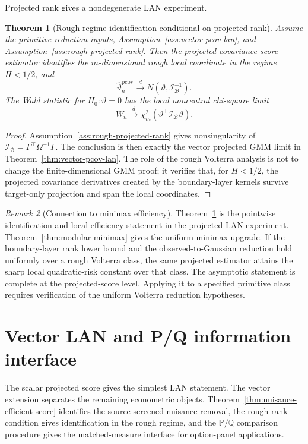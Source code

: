 \documentclass[11pt,a4paper]{amsart}
\theoremstyle{plain}
\newtheorem{theorem}{Theorem}[section]
\theoremstyle{definition}
\theoremstyle{remark}
\newtheorem{remark}[theorem]{Remark}
\newcommand{\PP}{\mathbb{P}}
\newcommand{\QQ}{\mathbb{Q}}
\newcommand{\toD}{\xrightarrow{d}}
\newcommand{\scrB}{\mathcal{B}}
\newcommand{\scrI}{\mathcal{I}}
\begin{document}
Projected rank gives a nondegenerate LAN experiment.

\begin{theorem}[Rough-regime identification conditional on projected rank]\label{thm:rough-identification}
Assume the primitive reduction inputs, Assumption~\ref{ass:vector-pcov-lan}, and
Assumption~\ref{ass:rough-projected-rank}.  Then the projected covariance-score estimator identifies
the \(m\)-dimensional rough local coordinate in the regime \(H<1/2\), and
\[
        \widehat\vartheta_n^{\mathrm{pcov}}
        \toD
        N(\vartheta,\scrI_{\scrB}^{-1}).
\]
The Wald statistic for \(H_0:\vartheta=0\) has the local noncentral chi-square limit
\[
        W_n\toD\chi_m^2(\vartheta^\top\scrI_{\scrB}\vartheta).
\]
\end{theorem}

\begin{proof}
Assumption~\ref{ass:rough-projected-rank} gives nonsingularity of
\(\scrI_{\scrB}=\Gamma^\top\Omega^{-1}\Gamma\).  The conclusion is then exactly the vector projected
GMM limit in Theorem~\ref{thm:vector-pcov-lan}.  The role of the rough Volterra analysis is not to
change the finite-dimensional GMM proof; it verifies that, for \(H<1/2\), the projected covariance
derivatives created by the boundary-layer kernels survive target-only projection and span the local
coordinates.
\end{proof}

\begin{remark}[Connection to minimax efficiency]
Theorem~\ref{thm:rough-identification} is the pointwise identification and local-efficiency
statement in the projected LAN experiment.  Theorem~\ref{thm:modular-minimax} gives the uniform
minimax upgrade.  If the boundary-layer rank lower bound and the observed-to-Gaussian reduction hold
uniformly over a rough Volterra class, the same projected estimator attains the sharp local
quadratic-risk constant over that class.  The asymptotic statement is complete at the
projected-score level.  Applying it to a specified primitive class requires verification of the
uniform Volterra reduction hypotheses.
\end{remark}


\section{Vector LAN and P/Q information interface}\label{sec:efficiency-roadmap}

The scalar projected score gives the simplest LAN statement.  The vector extension separates the
remaining econometric objects.  Theorem~\ref{thm:nuisance-efficient-score} identifies the
source-screened nuisance removal, the rough-rank condition gives identification in the rough regime,
and the \(\PP/\QQ\) comparison procedure gives the matched-measure interface for option-panel
applications.
\end{document}
